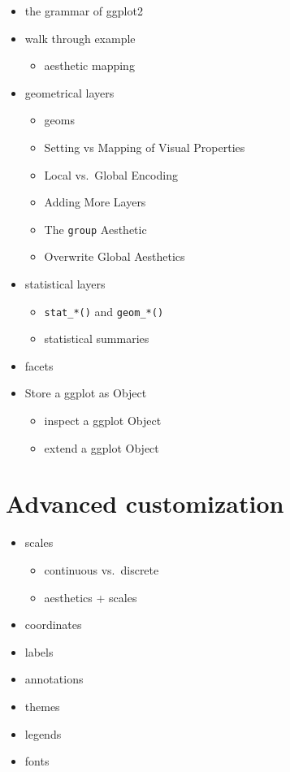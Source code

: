 \documentclass[
]{book}
\providecommand{\tightlist}{%
  \setlength{\itemsep}{0pt}\setlength{\parskip}{0pt}}
\begin{document}
\begin{itemize}
\tightlist
\item
  the grammar of ggplot2
\item
  walk through example

  \begin{itemize}
  \tightlist
  \item
    aesthetic mapping
  \end{itemize}
\item
  geometrical layers

  \begin{itemize}
  \tightlist
  \item
    geoms
  \item
    Setting vs Mapping of Visual Properties
  \item
    Local vs.~Global Encoding
  \item
    Adding More Layers
  \item
    The \texttt{group} Aesthetic
  \item
    Overwrite Global Aesthetics
  \end{itemize}
\item
  statistical layers

  \begin{itemize}
  \tightlist
  \item
    \texttt{stat\_*()} and \texttt{geom\_*()}
  \item
    statistical summaries
  \end{itemize}
\item
  facets
\item
  Store a ggplot as Object

  \begin{itemize}
  \tightlist
  \item
    inspect a ggplot Object
  \item
    extend a ggplot Object
  \end{itemize}
\end{itemize}

\hypertarget{advanced-customization-1}{%
\section{Advanced customization}\label{advanced-customization-1}}

\begin{itemize}
\tightlist
\item
  scales

  \begin{itemize}
  \tightlist
  \item
    continuous vs.~discrete
  \item
    aesthetics + scales
  \end{itemize}
\item
  coordinates
\item
  labels
\item
  annotations
\item
  themes
\item
  legends
\item
  fonts
\end{itemize}
\end{document}
